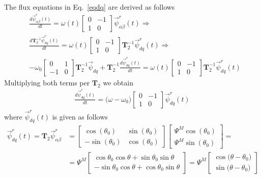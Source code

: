\documentclass[11pt,a4paper,oneside]{book}
\numberwithin{equation}{section}
\theoremstyle{it}
\theoremstyle{definition}
\begin{document}
The flux equations in Eq.~\ref{eqdq} are derived as follows
\begin{equation}
	\begin{aligned}
		& \frac{d\vec{\psi}^r_{\alpha\beta}(t)}{dt} = \omega(t) 
		\begin{bmatrix} 0 & -1 \\ 1 & 0\end{bmatrix} 
		\vec{\psi}^r_{\alpha\beta}(t) \Rightarrow \\[6pt]
		& \frac{d\mathbf{T}_2^{-1}\vec{\psi}^r_{dq}(t)}{dt} = \omega(t) 
		\begin{bmatrix} 0 & -1 \\ 1 & 0\end{bmatrix} 
		\mathbf{T}_2^{-1}\vec{\psi}^r_{dq}(t) \Rightarrow \\[6pt]
		&- \omega_0\begin{bmatrix} 0 & 1\\-1 & 0 
		\end{bmatrix}\mathbf{T}_2^{-1}\vec{\psi}_{dq} + 
		\mathbf{T}_2^{-1}\frac{d\vec{\psi}^r_{dq}(t)}{dt} = \omega(t) 
		\begin{bmatrix} 0 & -1 \\ 1 & 0\end{bmatrix} 
		\mathbf{T}_2^{-1}\vec{\psi}^r_{dq}(t)
	\end{aligned}
\end{equation}
Multiplying both terms per $\mathbf{T}_2$ we obtain
\begin{equation}
	\begin{aligned}
		\frac{d\vec{\psi}^r_{dq}(t)}{dt} = 
		\big(\omega-\omega_0\big)\begin{bmatrix} 0 & -1 \\ 1 & 
			0\end{bmatrix} \vec{\psi}^r_{dq}(t)
	\end{aligned}
\end{equation}
where $\vec{\psi}^r_{dq}(t)$ is given as follows
\begin{equation}
	\begin{aligned}
		\vec{\psi}^r_{dq}(t) = \mathbf{T}_2\vec{\psi}^r_{\alpha\beta} &= 
		\begin{bmatrix} \cos(\theta_0) & \sin(\theta_0) \\[6pt] 
			-\sin(\theta_0) & \cos(\theta_0) \end{bmatrix} \begin{bmatrix} 
			\Psi^M\cos(\theta_0) \\[6pt] \Psi^M\sin(\theta_0) \end{bmatrix} = 
		\\[6pt]
		&=\Psi^M \begin{bmatrix} \cos\theta_0\cos\theta + 
			\sin\theta_0\sin\theta \\[6pt] 
			-\sin\theta_0\cos\theta+\cos\theta_0\sin\theta\end{bmatrix} =  
		\Psi^M\begin{bmatrix} \cos\big(\theta -\theta_0\big) \\[6pt] 
			\sin\big(\theta -\theta_0\big)\end{bmatrix}
	\end{aligned}
\end{equation}
\end{document}
